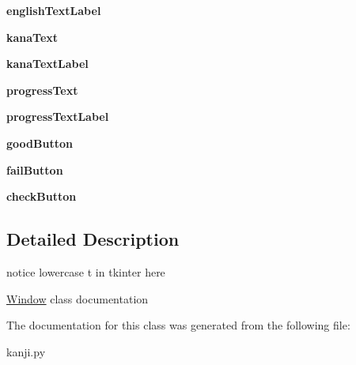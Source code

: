 \begin{DoxyCompactItemize}
{\bfseries english\+Text\+Label}
\item 
\mbox{\label{classkanji_1_1_window_a0610cf4fa5f696384ec92e54cd80a429}} 
{\bfseries kana\+Text}
\item 
\mbox{\label{classkanji_1_1_window_a30a57e670c44f809e1783e1ff2838385}} 
{\bfseries kana\+Text\+Label}
\item 
\mbox{\label{classkanji_1_1_window_ab130855abb3a087619dfd37451129fe5}} 
{\bfseries progress\+Text}
\item 
\mbox{\label{classkanji_1_1_window_a05c0e68e8d18d076cddfc98f131b2b3b}} 
{\bfseries progress\+Text\+Label}
\item 
\mbox{\label{classkanji_1_1_window_ab9de32bf300d96ce43900a536a59d63e}} 
{\bfseries good\+Button}
\item 
\mbox{\label{classkanji_1_1_window_a2a71601bb965857ccb1e0270a314d8de}} 
{\bfseries fail\+Button}
\item 
\mbox{\label{classkanji_1_1_window_a016b7f354f777fd4970cfee4fef0ef6a}} 
{\bfseries check\+Button}
\end{DoxyCompactItemize}


\subsection{Detailed Description}
notice lowercase \textquotesingle{}t\textquotesingle{} in tkinter here 

\mbox{\hyperlink{classkanji_1_1_window}{Window}} class documentation 

The documentation for this class was generated from the following file\+:\begin{DoxyCompactItemize}
\item 
kanji.\+py\end{DoxyCompactItemize}
